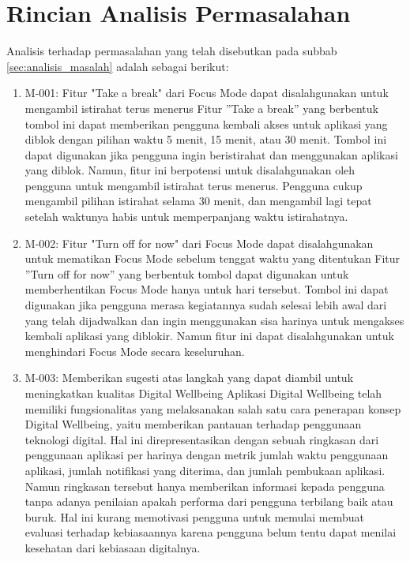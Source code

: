 \chapter{Rincian Analisis Permasalahan}
\label{chpt:rincian_analisis_permasalahan}

Analisis terhadap permasalahan yang telah disebutkan pada subbab \ref{sec:analisis_masalah} adalah sebagai berikut:

\begin{enumerate}
  \item M-001: Fitur "Take a break" dari Focus Mode dapat disalahgunakan untuk mengambil istirahat terus menerus
  \subitem Fitur ”Take a break” yang berbentuk tombol ini dapat memberikan pengguna kembali akses untuk aplikasi yang diblok dengan pilihan waktu 5 menit, 15 menit, atau 30 menit. Tombol ini dapat digunakan jika pengguna ingin beristirahat dan menggunakan aplikasi yang diblok. Namun, fitur ini berpotensi untuk disalahgunakan oleh pengguna untuk mengambil istirahat terus menerus. Pengguna cukup mengambil pilihan istirahat selama 30 menit, dan mengambil lagi tepat setelah waktunya habis untuk memperpanjang waktu istirahatnya.
  
  \item M-002: Fitur "Turn off for now" dari Focus Mode dapat disalahgunakan untuk mematikan Focus Mode sebelum tenggat waktu yang ditentukan
  \subitem Fitur ”Turn off for now” yang berbentuk tombol dapat digunakan untuk memberhentikan Focus Mode hanya untuk hari tersebut. Tombol ini dapat digunakan jika pengguna merasa kegiatannya sudah selesai lebih awal dari yang telah dijadwalkan dan ingin menggunakan sisa harinya untuk mengakses kembali aplikasi yang diblokir. Namun fitur ini dapat disalahgunakan untuk menghindari Focus Mode secara keseluruhan.
   
  \item M-003: Memberikan sugesti atas langkah yang dapat diambil untuk meningkatkan kualitas Digital Wellbeing
  \subitem Aplikasi Digital Wellbeing telah memiliki fungsionalitas yang melaksanakan salah satu cara penerapan konsep Digital Wellbeing, yaitu memberikan pantauan terhadap penggunaan teknologi digital. Hal ini direpresentasikan dengan sebuah ringkasan dari penggunaan aplikasi per harinya dengan metrik jumlah waktu penggunaan aplikasi, jumlah notifikasi yang diterima, dan jumlah pembukaan aplikasi. Namun ringkasan tersebut hanya memberikan informasi kepada pengguna tanpa adanya penilaian apakah performa dari pengguna terbilang baik atau buruk. Hal ini kurang memotivasi pengguna untuk memulai membuat evaluasi terhadap kebiasaannya karena pengguna belum tentu dapat menilai kesehatan dari kebiasaan digitalnya.
   
\end{enumerate}